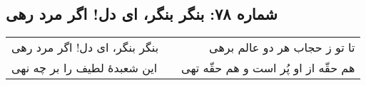 \begin{center}
\section*{شماره ۷۸: بنگر بنگر، ای دل! اگر مرد رهی}
\label{sec:078}
\begin{longtable}{l p{0.5cm} r}
بنگر بنگر، ای دل! اگر مرد رهی
&&
تا تو ز حجاب هر دو عالم برهی
\\
این شعبدهٔ لطیف را بر چه نهی
&&
هم حقّه از او پُر است و هم حقّه تهی
\\
\end{longtable}
\end{center}
